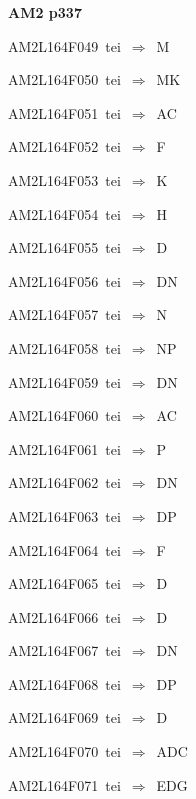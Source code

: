 \par\vfill\eject
{\bf\hfill AM2 p337\hfill\hbox{}}\par\bigskip
{\sixrm AM2L164F049\ {\sixit tei}\ }$\Rightarrow$\ M\par\smallskip
{\sixrm AM2L164F050\ {\sixit tei}\ }$\Rightarrow$\ MK\par\smallskip
{\sixrm AM2L164F051\ {\sixit tei}\ }$\Rightarrow$\ AC\par\smallskip
{\sixrm AM2L164F052\ {\sixit tei}\ }$\Rightarrow$\ F\par\smallskip
{\sixrm AM2L164F053\ {\sixit tei}\ }$\Rightarrow$\ K\par\smallskip
{\sixrm AM2L164F054\ {\sixit tei}\ }$\Rightarrow$\ H\par\smallskip
{\sixrm AM2L164F055\ {\sixit tei}\ }$\Rightarrow$\ D\par\smallskip
{\sixrm AM2L164F056\ {\sixit tei}\ }$\Rightarrow$\ DN\par\smallskip
{\sixrm AM2L164F057\ {\sixit tei}\ }$\Rightarrow$\ N\par\smallskip
{\sixrm AM2L164F058\ {\sixit tei}\ }$\Rightarrow$\ NP\par\smallskip
{\sixrm AM2L164F059\ {\sixit tei}\ }$\Rightarrow$\ DN\par\smallskip
{\sixrm AM2L164F060\ {\sixit tei}\ }$\Rightarrow$\ AC\par\smallskip
{\sixrm AM2L164F061\ {\sixit tei}\ }$\Rightarrow$\ P\par\smallskip
{\sixrm AM2L164F062\ {\sixit tei}\ }$\Rightarrow$\ DN\par\smallskip
{\sixrm AM2L164F063\ {\sixit tei}\ }$\Rightarrow$\ DP\par\smallskip
{\sixrm AM2L164F064\ {\sixit tei}\ }$\Rightarrow$\ F\par\smallskip
{\sixrm AM2L164F065\ {\sixit tei}\ }$\Rightarrow$\ D\par\smallskip
{\sixrm AM2L164F066\ {\sixit tei}\ }$\Rightarrow$\ D\par\smallskip
{\sixrm AM2L164F067\ {\sixit tei}\ }$\Rightarrow$\ DN\par\smallskip
{\sixrm AM2L164F068\ {\sixit tei}\ }$\Rightarrow$\ DP\par\smallskip
{\sixrm AM2L164F069\ {\sixit tei}\ }$\Rightarrow$\ D\par\smallskip
{\sixrm AM2L164F070\ {\sixit tei}\ }$\Rightarrow$\ ADC\par\smallskip
{\sixrm AM2L164F071\ {\sixit tei}\ }$\Rightarrow$\ EDG\par\smallskip
